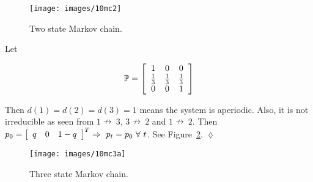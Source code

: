 \begin{figure}[ht!]
\centering
\texttt{[image: images/10mc2]}
\caption{Two state Markov chain.}%
\label{fig:10mc2}
\end{figure}

\begin{example}
Let

\begin{equation*}
\mathbb{P} = \left[\begin{array}{c c c} 1 & 0 & 0 \\ \frac{1}{3} & \frac{1}{3} & \frac{1}{3} \\ 0 & 0 & 1 \end{array}\right]
\end{equation*}

Then $d (1)=d (2)=d (3)=1$ means the system is aperiodic.
Also, it is not irreducible as seen from $1\nrightarrow~3$, $3\nrightarrow~2$ and $1\nrightarrow~2$.
Then $p_0=\left[\begin{array}{c c c} q & 0 & 1-q \end{array}\right]^T \Rightarrow~p_t=p_0~\forall~t$.
See Figure~\ref{fig:10mc3a}.
$\lozenge$
\end{example}

\begin{figure}[ht!]
\centering
\texttt{[image: images/10mc3a]}
\caption{Three state Markov chain.}
\label{fig:10mc3a}
\end{figure}

